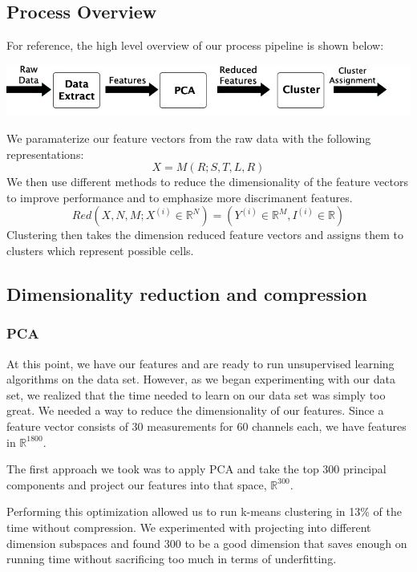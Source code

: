 \documentclass[conference]{IEEEtran}
\begin{document}
\subsection{Process Overview}

For reference, the high level overview of our process pipeline is shown
below: 
\begin{center}
  \includegraphics[width=0.8\linewidth]{../poster/images/pipeline.jpg}
\end{center}

We paramaterize our feature vectors from the raw data with the following representations:
$$X = M(R; S,T,L,R)$$
We then use different methods to reduce the dimensionality of
the feature vectors to improve performance and to emphasize
more discrimanent features.
  $$Red(X,N,M; X^{(i)} \in \mathbb{R}^N) = (Y^{(i)} \in
  \mathbb{R}^M,I^{(i)} \in \mathbb{R})$$
Clustering then takes the dimension reduced feature vectors
and assigns them to clusters which represent possible cells.

\subsection{Dimensionality reduction and compression}
\subsubsection{PCA}
At this point, we have our features and are ready to run unsupervised
learning algorithms on the data set. However, as we began experimenting
with our data set, we realized that the time needed to learn on our data
set was simply too great. We needed a way to reduce the dimensionality of
our features. Since a feature vector consists of 30 measurements for 60
channels each, we have features in $\mathbb{R}^{1800}$.

The first approach we took was to apply PCA and take the top 300 principal
components and project our features into that space, $\mathbb{R}^{300}$.

Performing this optimization allowed us to run k-means clustering in 13\%
of the time without compression. We experimented with projecting into
different dimension subspaces and found 300 to be a good dimension that
saves enough on running time without sacrificing too much in terms of
underfitting.
\end{document}
